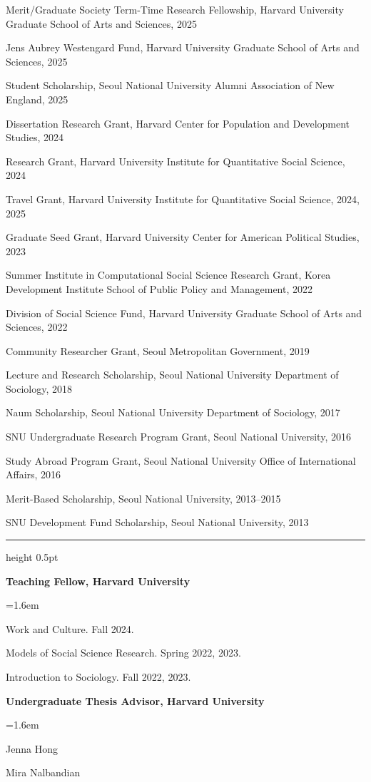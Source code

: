 \documentclass[11pt,letterpaper]{article}
\newcommand{\cvneed}[1]{%
  \par
  \ifdim\pagegoal=\maxdimen\else
    \cvroom=\dimexpr\pagegoal-\pagetotal\relax
    \ifdim\cvroom<#1\relax\newpage\fi
  \fi}
\newcommand{\cvsection}[1]{%
  \par\addvspace{1.15em}%
  \cvneed{4\baselineskip}%
  \noindent{\small\bfseries\textls{\MakeUppercase{#1}}}\par
  \vspace{0.25em}%
  {\color{rulegray}\hrule height 0.5pt}%
  \vspace{0.55em}%
  \nobreak\ignorespaces}
\newenvironment{sublines}{%
  \par\nobreak
  \begingroup
  \small
  \RaggedRight
  \leftskip=1.6em
  \setlength{\parskip}{0.32em}\setlength{\parindent}{0pt}%
}{\par\endgroup\vspace{0.2em}}
\newcommand{\entry}[1]{\par\addvspace{0.85em}\cvneed{3\baselineskip}\noindent #1\par\nobreak}
\begin{document}
Merit/Graduate Society Term-Time Research Fellowship, Harvard University Graduate School of Arts and Sciences, 2025

Jens Aubrey Westengard Fund, Harvard University Graduate School of Arts and Sciences, 2025

Student Scholarship, Seoul National University Alumni Association of New England, 2025

Dissertation Research Grant, Harvard Center for Population and Development Studies, 2024

Research Grant, Harvard University Institute for Quantitative Social Science, 2024

Travel Grant, Harvard University Institute for Quantitative Social Science, 2024, 2025

Graduate Seed Grant, Harvard University Center for American Political Studies, 2023

Summer Institute in Computational Social Science Research Grant, Korea Development Institute School of Public Policy and Management, 2022

Division of Social Science Fund, Harvard University Graduate School of Arts and Sciences, 2022

Community Researcher Grant, Seoul Metropolitan Government, 2019

Lecture and Research Scholarship, Seoul National University Department of Sociology, 2018

Naum Scholarship, Seoul National University Department of Sociology, 2017

SNU Undergraduate Research Program Grant, Seoul National University, 2016

Study Abroad Program Grant, Seoul National University Office of International Affairs, 2016

Merit-Based Scholarship, Seoul National University, 2013--2015

SNU Development Fund Scholarship, Seoul National University, 2013

\cvsection{Teaching}
\entry{\textbf{Teaching Fellow, Harvard University}}
\begin{sublines}
Work and Culture. Fall 2024.

Models of Social Science Research. Spring 2022, 2023.

Introduction to Sociology. Fall 2022, 2023.
\end{sublines}

\entry{\textbf{Undergraduate Thesis Advisor, Harvard University}}
\begin{sublines}
Jenna Hong

Mira Nalbandian
\end{sublines}
\end{document}
